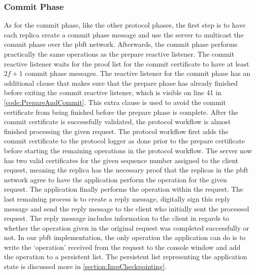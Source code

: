 \subsubsection{Commit Phase}
As for the commit phase, like the other protocol phases, the first step is to have each replica create a commit phase message and use the server to multicast the commit phase over the \ac{pbft} network. Afterwards, the commit phase performs practically the same operations as the prepare reactive listener. The commit reactive listener waits for the proof list for the commit certificate to have at least $2f+1$ commit phase messages. The reactive listener for the commit phase has an additional  clause that makes sure that the prepare phase has already finished before exiting the commit reactive listener, which is visible on line 41 in \autoref{code:PrepareAndCommit}. This extra  clause is used to avoid the commit certificate from being finished before the prepare phase is complete.  After the commit certificate is successfully validated, the protocol workflow is almost finished processing the given request. The protocol workflow first adds the commit certificate to the protocol logger as done prior to the prepare certificate before starting the remaining operations in the protocol workflow. The server now has two valid certificates for the given sequence number assigned to the client request, meaning the replica has the necessary proof that the replicas in the \ac{pbft} network agree to have the application perform the operation for the given request. The application finally performs the operation within the request. The last remaining process is to create a reply message, digitally sign this reply message and send the reply message to the client who initially sent the processed request. The reply message includes information to the client in regards to whether the operation given in the original request was completed successfully or not. In our \ac{pbft} implementation, the only operation the application can do is to write the ‘operation’ received from the request to the console window and add the operation to a persistent list. The persistent list representing the application state is discussed more in \autoref{section:ImpCheckpointing}.

